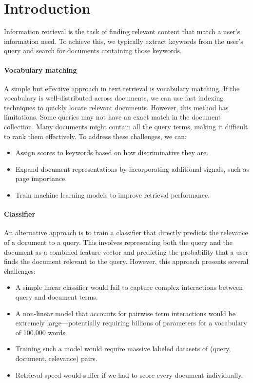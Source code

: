 \section{Introduction}

Information retrieval is the task of finding relevant content that match a user's information need.
To achieve this, we typically extract keywords from the user's query and search for documents containing those keywords.

\paragraph*{Vocabulary matching}
A simple but effective approach in text retrieval is vocabulary matching. 
If the vocabulary is well-distributed across documents, we can use fast indexing techniques to quickly locate relevant documents. 
However, this method has limitations.
Some queries may not have an exact match in the document collection.
Many documents might contain all the query terms, making it difficult to rank them effectively.
To address these challenges, we can: 
\begin{itemize}
    \item Assign scores to keywords based on how discriminative they are.
    \item Expand document representations by incorporating additional signals, such as page importance.
    \item Train machine learning models to improve retrieval performance.
\end{itemize}

\paragraph*{Classifier}
An alternative approach is to train a classifier that directly predicts the relevance of a document to a query. 
This involves representing both the query and the document as a combined feature vector and predicting the probability that a user finds the document relevant to the query.
However, this approach presents several challenges:
\begin{itemize}
    \item A simple linear classifier would fail to capture complex interactions between query and document terms.
    \item A non-linear model that accounts for pairwise term interactions would be extremely large—potentially requiring billions of parameters for a vocabulary of 100,000 words.
    \item Training such a model would require massive labeled datasets of (query, document, relevance) pairs.
    \item Retrieval speed would suffer if we had to score every document individually.
\end{itemize}
